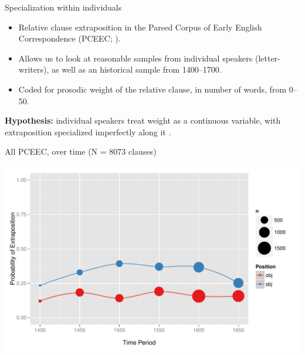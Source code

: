 \documentclass[hyperref={pdfpagelabels=false}]{beamer}
\begin{document}
\begin{frame}{Specialization within individuals}
\begin{itemize}
	\item Relative clause extraposition in the Parsed Corpus of Early English Correspondence  (PCEEC; \citealt{pceec}).
	\item Allows us to look at reasonable samples from individual speakers (letter-writers), as well as an historical sample from 1400--1700.
	\item Coded for prosodic weight of the relative clause, in number of words, from 0--50.
\end{itemize}
	\textbf{Hypothesis:} individual speakers treat weight as a continuous variable, with extraposition specialized imperfectly along it \citep[as suggested by][]{antonmackenzie2011a}.

\end{frame}




\begin{frame}{All PCEEC, over time (N = 8073 clauses)}

\begin{center}
\includegraphics[width=1.1\textwidth]{exSbjObjYearBinned50.pdf}
\end{center}
\end{frame}
\end{document}
